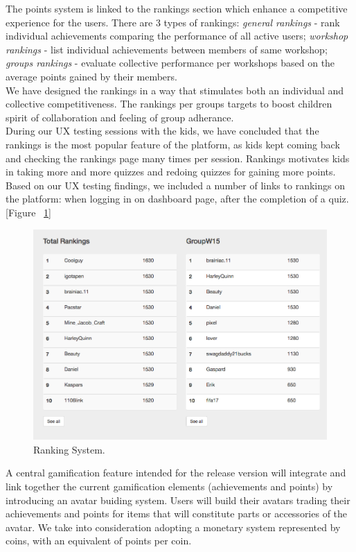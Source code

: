 The points system is linked to the rankings section which enhance a competitive experience for the users. 
There are 3 types of rankings: \textit{general rankings} - rank individual achievements comparing the performance of all active users; \textit{workshop rankings} - list individual achievements between members of same workshop; \textit{groups rankings} - evaluate collective performance per workshops based on the average points gained by their members. \\

We have designed the rankings in a way that stimulates both an individual and collective competitiveness. The rankings per groups targets to boost children spirit of collaboration and feeling of group adherance. \\

During our UX testing sessions with the kids, we have concluded that the rankings is the most popular feature of the platform, as kids kept coming back and checking the rankings page many times per session. Rankings motivates kids in taking more and more quizzes and redoing quizzes for gaining more points.
Based on our UX testing findings, we included a number of links to rankings on the platform: when logging in on dashboard page, after the completion of a quiz. [Figure ~\ref{fig:Rankings}]
\\

\begin{figure}
\includegraphics[width=1\linewidth]{images/ui/Rankings.png}
\caption{Ranking System.}
\label{fig:Rankings}
\end{figure}

A central gamification feature intended for the release version will integrate and link together the current gamification elements (achievements and points) by introducing an avatar buiding system. Users will build their avatars trading their achievements and points for items that will constitute parts or accessories of the avatar. We take into consideration adopting a monetary system represented by coins, with an equivalent of points per coin.

